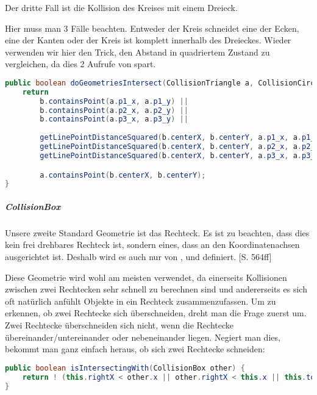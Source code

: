Der dritte Fall ist die Kollision des Kreises mit einem Dreieck.

Hier muss man 3 Fälle beachten. Entweder der Kreis schneidet eine der Ecken, eine der Kanten oder der Kreis ist komplett innerhalb des Dreieckes. Wieder verwenden wir hier den Trick, den Abstand in quadriertem Zustand zu vergleichen, da dies 2 Aufrufe von  spart.


\doinline
\begin{lstlisting}[caption=Erkennen von Kollisionen (Kreis-Dreieck), title=\hspace{0 pt}, language=java]
public boolean doGeometriesIntersect(CollisionTriangle a, CollisionCircle b) {
	return 
		b.containsPoint(a.p1_x, a.p1_y) ||
		b.containsPoint(a.p2_x, a.p2_y) ||
		b.containsPoint(a.p3_x, a.p3_y) ||
		
		getLinePointDistanceSquared(b.centerX, b.centerY, a.p1_x, a.p1_y, a.p2_x, a.p2_y) <= (b.radius*b.radius) ||
		getLinePointDistanceSquared(b.centerX, b.centerY, a.p2_x, a.p2_y, a.p3_x, a.p3_y) <= (b.radius*b.radius) ||
		getLinePointDistanceSquared(b.centerX, b.centerY, a.p3_x, a.p3_y, a.p1_x, a.p1_y) <= (b.radius*b.radius) ||

		a.containsPoint(b.centerX, b.centerY);
}
\end{lstlisting}

\subparagraph{CollisionBox}

Unsere zweite Standard Geometrie ist das Rechteck. Es ist zu beachten, dass dies kein frei drehbares Rechteck ist, sondern eines, dass an den Koordinatenachsen ausgerichtet ist. Deshalb wird es auch nur von ,  und  definiert. \cite{EMFGAIA}[S. 564ff]

Diese Geometrie wird wohl am meisten verwendet, da einerseits Kollisionen zwischen zwei Rechtecken sehr schnell zu berechnen sind und andererseits es sich oft natürlich anfühlt Objekte in ein Rechteck zusammenzufassen. Um zu erkennen, ob zwei Rechtecke sich überschneiden, dreht man die Frage zuerst um. Zwei Rechtecke überschneiden sich nicht, wenn die Rechtecke übereinander/untereinander oder nebeneinander liegen. Negiert man dies, bekommt man ganz einfach heraus, ob sich zwei Rechtecke schneiden:

\doinline
\begin{lstlisting}[caption=Erkennen von Kollisionen (Box-Box), title=\hspace{0 pt}, language=java]
public boolean isIntersectingWith(CollisionBox other) {
	return ! (this.rightX < other.x || other.rightX < this.x || this.topY < other.y || other.topY < this.y);
}
\end{lstlisting}

